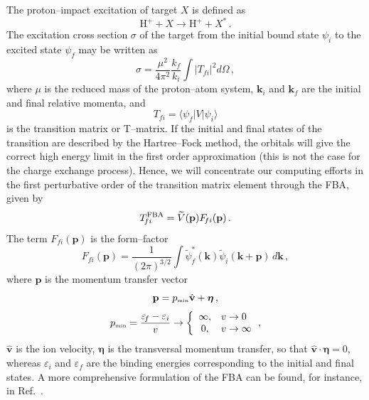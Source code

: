 \documentclass[10pt]{article}
\begin{document}
The proton--impact excitation of target $X$ is defined as 
\begin{equation}
 \mbox{H}^+ + X \rightarrow \mbox{H}^+ + X^*\,.
\end{equation}
The excitation cross section $\sigma$ of the target from the initial
bound state $\psi_i$ to the excited state $\psi_{\!f}$ may be written
as 
\begin{equation}
 \sigma=\frac{\mu^2}{4\pi^2}\frac{k_{\!f}}{k_i}\int{\left|T_{\!fi}\right|^2 
 d\Omega}\,,
  \label{eq:cross-section}
\end{equation}
where $\mu$ is the reduced mass of the proton--atom system, 
$\mathbf{k}_i$ and $\mathbf{k}_{\!f}$ are the initial and final 
relative momenta, and 
\begin{equation}
 T_{\!fi}=\langle \psi_{\!f}|V|\psi_i\rangle
 \label{eq:transition-matrix}
\end{equation}
is the transition matrix or T--matrix.
If the initial and final states of the transition are described by 
the Hartree--Fock method, the orbitals will give the correct high 
energy limit in the first order approximation (this is not the case 
for the charge exchange process). Hence, we will concentrate our 
computing efforts in the first perturbative order of the transition
matrix element through the FBA, given by
\begin{equation}
 T_{\!fi}^{\mbox{\scriptsize FBA}} = \widetilde{V}(\mathbf{p}) F_{\!fi}(\mathbf{p}) \,.
 \label{eq:firstbornTmatrix}
\end{equation}
The term $F_{\!fi}(\mathbf{p})$ is the form--factor
\begin{equation}
 F_{fi}(\mathbf{p}) = \frac{1}{(2\pi)^{3/2}} 
 \int{\widetilde{\psi}_{\!f}^*(\mathbf{k})
 \widetilde{\psi}_i(\mathbf{k}+\mathbf{p})\,d\mathbf{k}}\,,
 \label{eq:form-factor}
\end{equation}
where $\mathbf{p}$ is the momentum transfer vector
\begin{equation}
 \mathbf{p} = p_{\mbox{\tiny min}} \hat{\mathbf{v}} + \boldsymbol{\eta} \,,
\end{equation}
\begin{equation}
 p_{\mbox{\tiny min}} = \frac{\varepsilon_{\!f}-\varepsilon_i}{v} \rightarrow 
 \bigg\{
 \begin{array}{cl}
  \infty, &v\rightarrow 0 \\
  0, &v\rightarrow \infty
 \end{array}
 \,,
 \label{eq:pmin}
\end{equation}
$\hat{\mathbf{v}}$ is the ion velocity, $\boldsymbol{\eta}$ is
the transversal momentum transfer, so that 
$\hat{\mathbf{v}} \cdot \boldsymbol{\eta}=0$, whereas $\varepsilon_i$ 
and $\varepsilon_{\!f}$ are the binding energies corresponding to the 
initial and final states. 
A more comprehensive formulation of the FBA can be found, for 
instance, in Ref.~\cite{McDowell1970}. 
\end{document}
